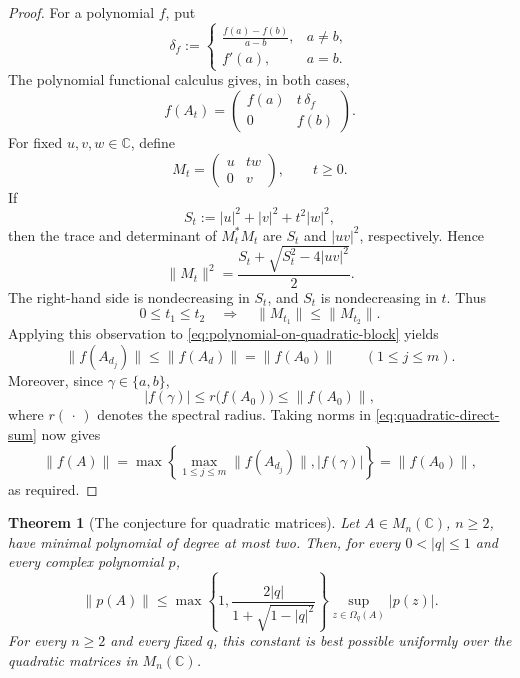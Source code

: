\documentclass[11pt]{article}
\newtheorem{theorem}{Theorem}[section]
\theoremstyle{remark}
\begin{document}
\begin{proof}
For a polynomial \(f\), put
\[
  \delta_f:=
  \begin{cases}
    \displaystyle\frac{f(a)-f(b)}{a-b},&a\neq b,\\[3mm]
    f'(a),&a=b.
  \end{cases}
\]
The polynomial functional calculus gives, in both cases,
\begin{equation}
\label{eq:polynomial-on-quadratic-block}
  f(A_t)=
  \begin{pmatrix}
    f(a)&t\,\delta_f\\
    0&f(b)
  \end{pmatrix}.
\end{equation}
For fixed \(u,v,w\in\mathbb C\), define
\[
  M_t=
  \begin{pmatrix}
    u&tw\\
    0&v
  \end{pmatrix},
  \qquad t\geq0.
\]
If
\[
  S_t:=|u|^2+|v|^2+t^2|w|^2,
\]
then the trace and determinant of \(M_t^*M_t\) are \(S_t\) and
\(|uv|^2\), respectively.  Hence
\begin{equation}
\label{eq:triangular-norm-formula}
  \|M_t\|^2
  =
  \frac{S_t+\sqrt{S_t^2-4|uv|^2}}{2}.
\end{equation}
The right-hand side is nondecreasing in \(S_t\), and \(S_t\) is
nondecreasing in \(t\).  Thus
\[
  0\leq t_1\leq t_2
  \quad\Longrightarrow\quad
  \|M_{t_1}\|\leq\|M_{t_2}\|.
\]
Applying this observation to
\eqref{eq:polynomial-on-quadratic-block} yields
\[
  \|f(A_{d_j})\|\leq\|f(A_d)\|
  =\|f(A_0)\|
  \qquad(1\leq j\leq m).
\]
Moreover, since \(\gamma\in\{a,b\}\),
\[
  |f(\gamma)|
  \leq r\bigl(f(A_0)\bigr)
  \leq\|f(A_0)\|,
\]
where \(r(\,\cdot\,)\) denotes the spectral radius.  Taking norms in
\eqref{eq:quadratic-direct-sum} now gives
\[
  \|f(A)\|
  =
  \max\left\{
       \max_{1\leq j\leq m}\|f(A_{d_j})\|,
       |f(\gamma)|
  \right\}
  =\|f(A_0)\|,
\]
as required.
\end{proof}

\begin{theorem}[The conjecture for quadratic matrices]
\label{thm:q-quadratic}
Let \(A\in M_n(\mathbb C)\), \(n\geq2\), have minimal polynomial of degree at most
two.  Then, for every \(0<|q|\leq1\) and every complex polynomial
\(p\),
\[
  \|p(A)\|
  \leq
  \max\left\{1,
       \frac{2|q|}{1+\sqrt{1-|q|^2}}\right\}
  \sup_{z\in\Omega_q(A)}|p(z)|.
\]
For every \(n\geq2\) and every fixed \(q\), this constant is best
possible uniformly over the quadratic matrices in \(M_n(\mathbb C)\).
\end{theorem}
\end{document}
